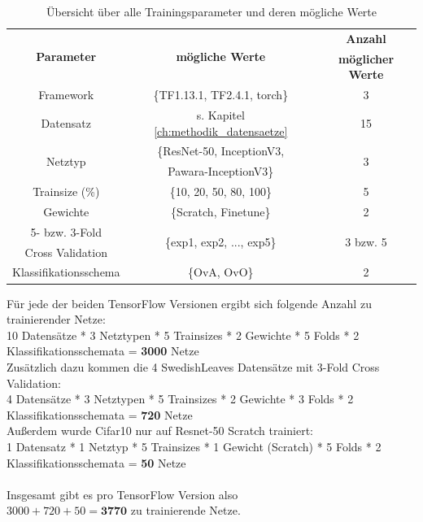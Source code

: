 \begin{table}[H]
\centering
\begin{tabular}{|c|c|c|}
\hline 
\multirow{2}{*}{\textbf{Parameter}} & \multirow{2}{*}{\textbf{mögliche Werte}} & \textbf{Anzahl} \\ 
& & \textbf{möglicher Werte} \\
\hline 
Framework & \{TF1.13.1, TF2.4.1, torch\} & 3\\
\hline
Datensatz & s. Kapitel \ref{ch:methodik_datensaetze} & 15\\
\hline 
\multirow{2}{*}{Netztyp} & \{ResNet-50, InceptionV3, & \multirow{2}{*}{3} \\
 & Pawara-InceptionV3\} & \\
\hline
Trainsize (\%) & \{10, 20, 50, 80, 100\}& 5 \\
\hline
Gewichte & \{Scratch, Finetune\} & 2 \\
\hline
5- bzw. 3-Fold & \multirow{2}{*}{\{exp1, exp2, ..., exp5\}} & \multirow{2}{*}{3 bzw. 5} \\
Cross Validation & & \\
\hline
Klassifikationsschema & \{OvA, OvO\} & 2 \\
\hline
\end{tabular} 
\caption{Übersicht über alle Trainingsparameter und deren mögliche Werte}
\label{tab:parameterUebersicht}
\end{table}

Für jede der beiden TensorFlow \cite{tensorflow} Versionen ergibt sich folgende Anzahl zu trainierender Netze:\\
\begin{adjustbox}{width=\textwidth, center}
10 Datensätze * 3 Netztypen * 5 Trainsizes * 2 Gewichte * 5 Folds * 2 Klassifikationsschemata = \textbf{3000} Netze\\
\end{adjustbox}
Zusätzlich dazu kommen die 4 SwedishLeaves \cite{swedishLeaves} Datensätze mit 3-Fold Cross Validation:\\
\begin{adjustbox}{width=\textwidth, center}
4 Datensätze * 3 Netztypen * 5 Trainsizes * 2 Gewichte * 3 Folds * 2 Klassifikationsschemata = \textbf{720} Netze\\
\end{adjustbox}
Außerdem wurde Cifar10 \cite{cifar10} nur auf Resnet-50 Scratch trainiert:\\
\begin{adjustbox}{width=\textwidth, center}
1 Datensatz * 1 Netztyp * 5 Trainsizes * 1 Gewicht (Scratch) * 5 Folds * 2 Klassifikationsschemata = \textbf{50} Netze\\
\end{adjustbox}
\\
Insgesamt gibt es pro TensorFlow \cite{tensorflow} Version also\\
$3000 + 720 + 50 = \textbf{3770}$ zu trainierende Netze.\\\\

